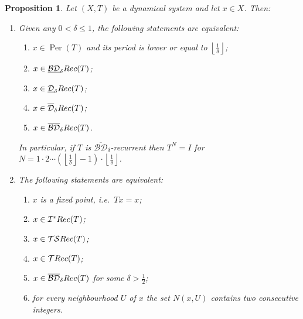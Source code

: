 \documentclass[openright,11pt]{article}
\theoremstyle{plain}
\newtheorem{proposition}[theorem]{Proposition}
\theoremstyle{definition}
\newcommand{\Ic}{\mathcal{I}}
\newcommand{\Tc}{\mathcal{T}}
\newcommand{\TS}{\mathcal{TS}}
\newcommand{\Per}{\operatorname{Per}}
\newcommand{\Rec}{\textup{Rec}}
\newcommand{\del}{\delta}
\newcommand{\BDsup}{\overline{\mathcal{BD}}}
\newcommand{\BDinf}{\underline{\mathcal{BD}}}
\newcommand{\Dsup}{\overline{\mathcal{D}}}
\newcommand{\Dinf}{\underline{\mathcal{D}}}
\begin{document}
\begin{proposition}\label{Pro:periodic-recurrence}
	Let $(X,T)$ be a dynamical system and let $x \in X$. Then:
	\begin{enumerate}[{\em(a)}]
		\item Given any $0<\del\leq 1$, the following statements are equivalent:
		\begin{enumerate}[{\em(i)}]
			\item $x \in \Per(T)$ and its period is lower or equal to $\left\lfloor\frac{1}{\del}\right\rfloor$;
			
			\item $x \in \BDinf_{\del}\Rec(T)$;
			
			\item $x \in \Dinf_{\del}\Rec(T)$;
			
			\item $x \in \Dsup_{\del}\Rec(T)$;
			
			\item $x \in \BDsup_{\del}\Rec(T)$.
		\end{enumerate}
		In particular, if $T$ is $\BDsup_{\del}$-recurrent then $T^N = I$ for $N=1\cdot 2\cdots \left(\left\lfloor\frac{1}{\del}\right\rfloor-1\right)\cdot \left\lfloor\frac{1}{\del}\right\rfloor$.%
		
		\item The following statements are equivalent:
		\begin{enumerate}[{\em(i)}]
			\item $x$ is a fixed point, i.e.\ $Tx=x$;
			
			\item $x \in \Ic^*\Rec(T)$;
			
			\item $x \in \TS\Rec(T)$;
			
			\item $x \in \Tc\Rec(T)$;
			
			\item $x \in \BDsup_{\del}\Rec(T)$ for some $\del>\frac{1}{2}$;
			
			\item for every neighbourhood $U$ of $x$ the set $N(x,U)$ contains two consecutive integers.
		\end{enumerate}
	\end{enumerate}
\end{proposition}
\end{document}
